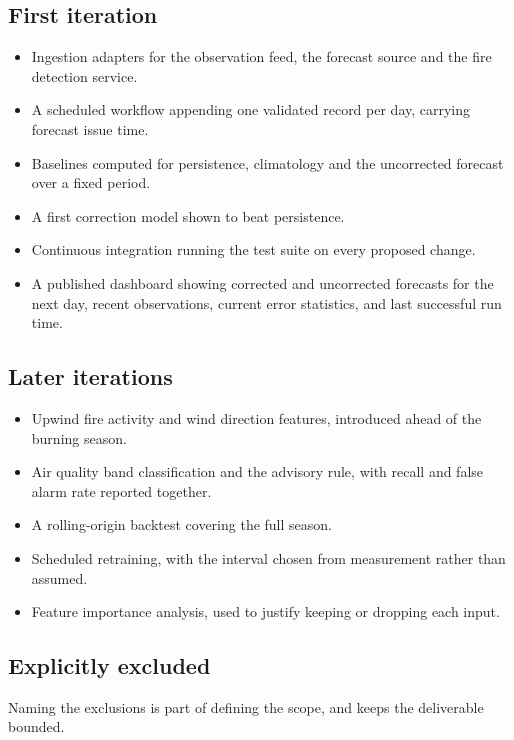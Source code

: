 \documentclass[11pt,a4paper]{article}
\begin{document}
\subsection{First iteration}
\begin{itemize}[leftmargin=0.7cm]
  \item Ingestion adapters for the observation feed, the
    forecast source and the fire detection service.
  \item A scheduled workflow appending one validated
    record per day, carrying forecast issue time.
  \item Baselines computed for persistence, climatology
    and the uncorrected forecast over a fixed period.
  \item A first correction model shown to beat
    persistence.
  \item Continuous integration running the test suite on
    every proposed change.
  \item A published dashboard showing corrected and
    uncorrected forecasts for the next day, recent
    observations, current error statistics, and last
    successful run time.
\end{itemize}

\subsection{Later iterations}
\begin{itemize}[leftmargin=0.7cm]
  \item Upwind fire activity and wind direction
    features, introduced ahead of the burning season.
  \item Air quality band classification and the advisory
    rule, with recall and false alarm rate reported
    together.
  \item A rolling-origin backtest covering the full
    season.
  \item Scheduled retraining, with the interval chosen
    from measurement rather than assumed.
  \item Feature importance analysis, used to justify
    keeping or dropping each input.
\end{itemize}

\subsection{Explicitly excluded}
Naming the exclusions is part of defining the scope, and
keeps the deliverable bounded.
\end{document}
